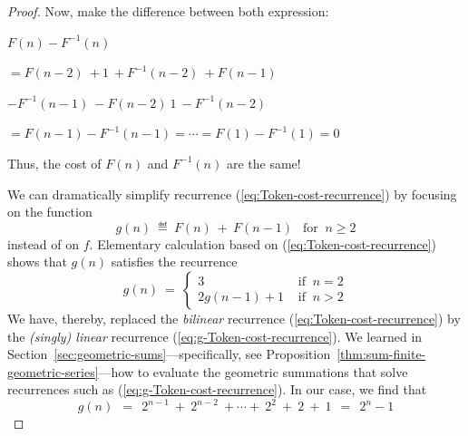 \begin{proof}
{\begin{minipage}{0.95\textwidth}
Now, make the difference between both expression:

$F(n) - F^{-1}(n)$

$= F(n-2) \ + 1 \ + F^{-1}(n-2) \ + F(n-1) $

$- F^{-1}(n-1) \ - F(n-2)  \  1 \ - F^{-1}(n-2)$

$= F(n-1) - F^{-1}(n-1) = \cdots = F(1) - F^{-1}(1) = 0$

Thus, the cost of $F(n)$ and $F^{-1}(n)$ are the same!
\end{minipage}
}
\bigskip

We can dramatically simplify recurrence
(\ref{eq:Token-cost-recurrence}) by focusing on the function
\[ g(n) \ \eqdef \ F(n) \ + \ F(n-1) \ \ \mbox{ for } \ n \geq 2 \]
instead of on $f$.  Elementary calculation based on
(\ref{eq:Token-cost-recurrence}) shows that $g(n)$ satisfies the
recurrence
\begin{equation}
\label{eq:g-Token-cost-recurrence}
g(n) \ = \ \left\{
\begin{array}{ll}
3 & \mbox{ if } \ n=2 \\
2 g(n-1) + 1 & \mbox{ if } \  n > 2
\end{array}
\right.
\end{equation}
We have, thereby, replaced the {\em bilinear} recurrence
(\ref{eq:Token-cost-recurrence}) by the {\em (singly) linear}
recurrence (\ref{eq:g-Token-cost-recurrence}).  We learned in
Section~\ref{sec:geometric-sums}---specifically, see
Proposition~\ref{thm:sum-finite-geometric-series}---how to evaluate
the geometric summations that solve recurrences such as
(\ref{eq:g-Token-cost-recurrence}).  In our case, we find that
%
\begin{equation}
\label{eq:VALUE-g-Token-cost}
g(n) \ \ = \ \ 2^{n-1} \ + \ 2^{n-2} \ + \cdots + \ 2^2 \ + \ 2 \ +
\ 1 \ \ = \ \ 2^{n} -1
\end{equation}
%

\medskip


\end{proof}
